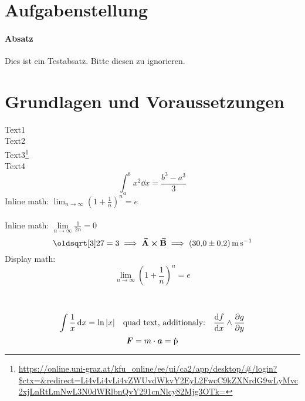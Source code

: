 \documentclass[ngerman]{scrartcl}
\begin{document}


\clearpage
\tableofcontents
\newpage

\section{Aufgabenstellung}
\label{sec:aufgabenstellung}

\paragraph{Absatz}
\label{par:absatz}

Dies ist ein Testabsatz. Bitte diesen zu ignorieren.



\section{Grundlagen und Voraussetzungen}
\label{sec:grundlagen_voraussetzungen}

Text1 \cite[1000]{ref:dem1} \\
Text2 \cite[Kapitel 74]{ref:knoll} \\
Text3\footnote{\url{https://online.uni-graz.at/kfu_online/ee/ui/ca2/app/desktop/\#/login?$ctx=&redirect=Li4vLi4vLi4vZWUvdWkvY2EyL2FwcC9kZXNrdG9wLyMvc2xjLnRtLmNwL3N0dWRlbnQvY291cnNlcy82Mjg3OTk=}} \\  %
Text4 \cite{ref:genol2013}
%
\begin{equation}
    \label{eq:grenzen-oben-unten}
    \int_a^b x^2 \dd{x} =\frac{b^3-a^3}{3}  %
\end{equation}
%
Inline math: \(\lim_{n \to \infty} \left( 1 + \frac{1}{n} \right) ^{n} = e\)  \\ \\ %
Inline math: $\lim \limits_{n \to \infty} \frac{1}{2n} = 0$  %
%
\begin{displaymath}
    \sqrt[3]{27} = 3 \implies \va{A} \cross \va{B} \implies \SI{30.0(2)}{\meter\per\second}
\end{displaymath}
%
Display math: \[\lim_{n \to \infty} \left( 1 + \frac{1}{n} \right) ^{n} = e\]  \\ \\ %
\[ \int \frac{1}{x} \dd{x} = \ln|x| \qq{quad text, additionaly:} \dv{f}{x} \land \pdv{g}{y}\]  %
$$ \vb*{F} = m \cdot \vb*{a} = \dot{\text{\textup{p}}}$$  %
\end{document}
